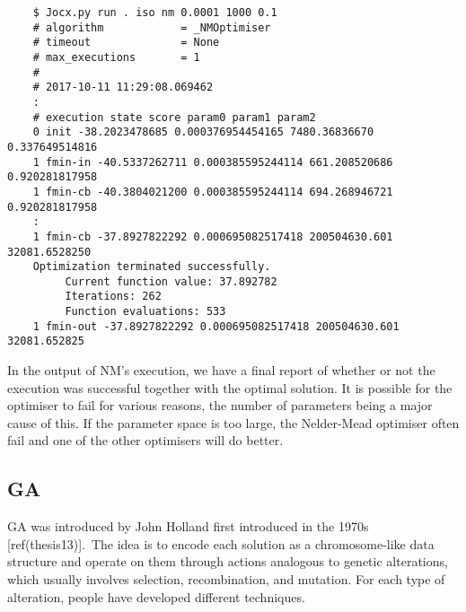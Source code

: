 \documentclass[graybox]{svmult}
\begin{document}
{\small{}\begin{verbatim}
    $ Jocx.py run . iso nm 0.0001 1000 0.1
    # algorithm            = _NMOptimiser
    # timeout              = None
    # max_executions       = 1
    #
    # 2017-10-11 11:29:08.069462
    :
    # execution state score param0 param1 param2
    0 init -38.2023478685 0.000376954454165 7480.36836670 0.337649514816
    1 fmin-in -40.5337262711 0.000385595244114 661.208520686 0.920281817958
    1 fmin-cb -40.3804021200 0.000385595244114 694.268946721 0.920281817958
    :
    1 fmin-cb -37.8927822292 0.000695082517418 200504630.601 32081.6528250
    Optimization terminated successfully.
         Current function value: 37.892782
         Iterations: 262
         Function evaluations: 533
    1 fmin-out -37.8927822292 0.000695082517418 200504630.601 32081.652825
\end{verbatim}}

In the output of NM's execution, we have a final report of whether or not the execution was successful together with the optimal solution. It is possible for the optimiser to fail for various reasons, the number of parameters being a major cause of this. If the parameter space is too large, the Nelder-Mead optimiser often fail and one of the other optimisers will do better.

\subsection{GA}

GA was introduced by John Holland first introduced in the 1970s [ref(thesis13)].\ The idea is to encode each solution as a chromosome-like data structure and operate on them through actions analogous to genetic alterations, which usually involves selection, recombination, and mutation. For each type of alteration, people have developed different techniques.
\end{document}
